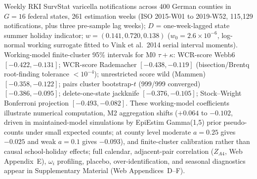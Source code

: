 \begin{table}[!t]
\par\smallskip\parbox{\linewidth}{\scriptsize Weekly RKI SurvStat varicella notifications across 400 German counties in $G = 16$ federal states, 261 estimation weeks (ISO 2015-W01 to 2019-W52, 115{,}129 notifications, plus three pre-sample lag weeks); $D$ = one-week-lagged state summer holiday indicator; $w = (0.141, 0.720, 0.138)$ ($w_0 = 2.6 \times 10^{-6}$, log-normal working surrogate fitted to Vink et al.\ 2014 serial interval moments). Working-model finite-cluster 95\% intervals for M0 $\tau+\kappa$: WCR-score Webb6 $[-0.422, -0.131]$; WCR-score Rademacher $[-0.438, -0.119]$ (bisection/Brentq root-finding tolerance $<10^{-4}$); unrestricted score wild (Mammen) $[-0.358, -0.122]$; pairs cluster bootstrap-$t$ (999/999 converged) $[-0.386, -0.095]$; delete-one-state jackknife $[-0.376, -0.105]$; Stock--Wright Bonferroni projection $[-0.493, -0.082]$. These working-model coefficients illustrate numerical computation, M2 aggregation shifts ($+0.064$ to $-0.102$, driven in maintained-model simulations by EpiEstim Gamma(1,5) prior pseudo-counts under small expected counts; at county level moderate $a=0.25$ gives $-0.025$ and weak $a=0.1$ gives $-0.093$), and finite-cluster calibration rather than causal school-holiday effects; full calendar, adjacent-pair correlation ($Z_{A4}$, Web Appendix~E), $\omega_i$ profiling, placebo, over-identification, and seasonal diagnostics appear in Supplementary Material (Web Appendices~D--F).}
\end{table}
